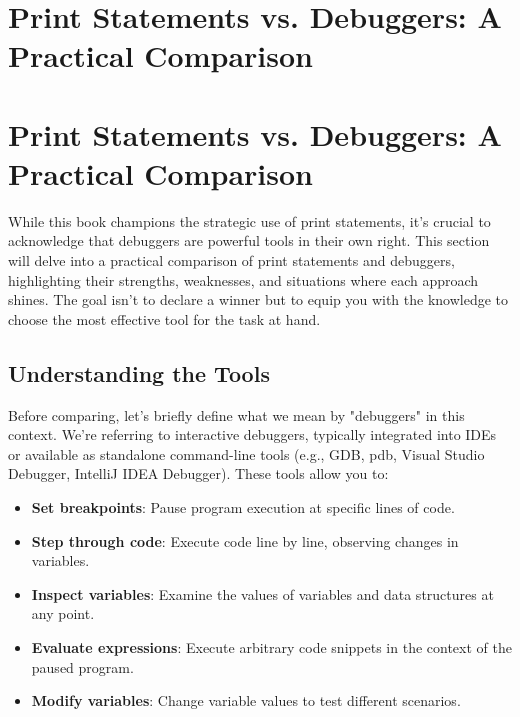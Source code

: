 \documentclass{article}
\begin{document}
\newpage

\section*{Print Statements vs. Debuggers: A Practical Comparison} %
\label{chapter-2-3-Print_Statements_vs._Debuggers__A_Practi}

\section*{Print Statements vs. Debuggers: A Practical Comparison}

While this book champions the strategic use of print statements, it's crucial to acknowledge that debuggers are powerful tools in their own right. This section will delve into a practical comparison of print statements and debuggers, highlighting their strengths, weaknesses, and situations where each approach shines. The goal isn't to declare a winner but to equip you with the knowledge to choose the most effective tool for the task at hand.

\subsection*{Understanding the Tools}

Before comparing, let's briefly define what we mean by "debuggers" in this context. We're referring to interactive debuggers, typically integrated into IDEs or available as standalone command-line tools (e.g., GDB, pdb, Visual Studio Debugger, IntelliJ IDEA Debugger). These tools allow you to:

\begin{itemize}
    \item \textbf{Set breakpoints}: Pause program execution at specific lines of code.
    \item \textbf{Step through code}: Execute code line by line, observing changes in variables.
    \item \textbf{Inspect variables}: Examine the values of variables and data structures at any point.
    \item \textbf{Evaluate expressions}: Execute arbitrary code snippets in the context of the paused program.
    \item \textbf{Modify variables}: Change variable values to test different scenarios.
\end{itemize}
\end{document}
